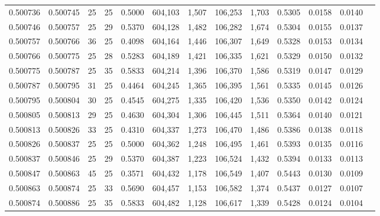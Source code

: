 \begin{tabular}{rrrrrrrrrrrrr}
0.500736 & 0.500745 &    25 &  25 &                                     0.5000 & 604,103 &   1,507 & 106,253 &   1,703 & 0.5305 & 0.0158 & 0.0140 \\
0.500746 & 0.500757 &    25 &  29 &                                     0.5370 & 604,128 &   1,482 & 106,282 &   1,674 & 0.5304 & 0.0155 & 0.0137 \\
0.500757 & 0.500766 &    36 &  25 &                                     0.4098 & 604,164 &   1,446 & 106,307 &   1,649 & 0.5328 & 0.0153 & 0.0134 \\
0.500766 & 0.500775 &    25 &  28 &                                     0.5283 & 604,189 &   1,421 & 106,335 &   1,621 & 0.5329 & 0.0150 & 0.0132 \\
0.500775 & 0.500787 &    25 &  35 &                                     0.5833 & 604,214 &   1,396 & 106,370 &   1,586 & 0.5319 & 0.0147 & 0.0129 \\
0.500787 & 0.500795 &    31 &  25 &                                     0.4464 & 604,245 &   1,365 & 106,395 &   1,561 & 0.5335 & 0.0145 & 0.0126 \\
0.500795 & 0.500804 &    30 &  25 &                                     0.4545 & 604,275 &   1,335 & 106,420 &   1,536 & 0.5350 & 0.0142 & 0.0124 \\
0.500805 & 0.500813 &    29 &  25 &                                     0.4630 & 604,304 &   1,306 & 106,445 &   1,511 & 0.5364 & 0.0140 & 0.0121 \\
0.500813 & 0.500826 &    33 &  25 &                                     0.4310 & 604,337 &   1,273 & 106,470 &   1,486 & 0.5386 & 0.0138 & 0.0118 \\
0.500826 & 0.500837 &    25 &  25 &                                     0.5000 & 604,362 &   1,248 & 106,495 &   1,461 & 0.5393 & 0.0135 & 0.0116 \\
0.500837 & 0.500846 &    25 &  29 &                                     0.5370 & 604,387 &   1,223 & 106,524 &   1,432 & 0.5394 & 0.0133 & 0.0113 \\
0.500847 & 0.500863 &    45 &  25 &                                     0.3571 & 604,432 &   1,178 & 106,549 &   1,407 & 0.5443 & 0.0130 & 0.0109 \\
0.500863 & 0.500874 &    25 &  33 &                                     0.5690 & 604,457 &   1,153 & 106,582 &   1,374 & 0.5437 & 0.0127 & 0.0107 \\
0.500874 & 0.500886 &    25 &  35 &                                     0.5833 & 604,482 &   1,128 & 106,617 &   1,339 & 0.5428 & 0.0124 & 0.0104 \\

\end{tabular}
